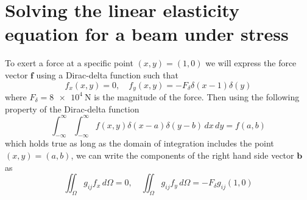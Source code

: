 \documentclass[11pt]{article}
\begin{document}
\section{Solving the linear elasticity equation for a beam under stress}
To exert a force at a specific point $(x,y) = (1,0)$ we will express the force vector $\bm{f}$ using a Dirac-delta function such that
\begin{equation}
  f_x(x,y) = 0, \quad f_y(x,y) = -F_\delta \delta(x-1)\delta(y)
\end{equation}
where $F_\delta = \SI{8e4}{\N}$ is the magnitude of the force. Then using the following property of the Dirac-delta function
\begin{equation}
  \int_{-\infty}^{\infty} \int_{-\infty}^{\infty} f(x,y) \delta(x-a) \delta(y-b) \, dx \, dy = f(a,b)
\end{equation}
which holds true as long as the domain of integration includes the point $(x,y) = (a,b)$, we can write the components of the right hand side vector $\bm{b}$ as
\begin{equation}
  \iint_\Omega g_{ij} f_x \, d\Omega = 0, \quad 
  \iint_\Omega g_{ij} f_y \, d\Omega = -F_\delta g_{ij}(1,0)
\end{equation}
\end{document}
